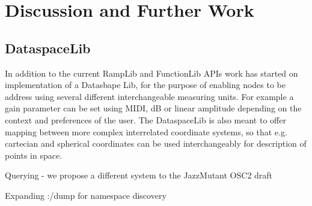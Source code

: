 \documentclass{NIME-alternate}
\begin{document}

\section{Discussion and Further Work} %
\label{sec:discussion_and_further_work}   

%

%
%
%



\subsection{DataspaceLib} %
\label{sub:dataspacelib}

In addition  to the current RampLib and FunctionLib APIs work has started on implementation of a Datasbape Lib, for the purpose of enabling nodes to be address using several different interchangeable measuring units. For example a gain parameter can be set using MIDI, dB or linear amplitude depending on the context and preferences of the user. The DataspaceLib is also meant to offer mapping between more complex interrelated coordinate systems, so that e.g. cartecian and spherical coordinates can be used interchangeably for description of points in space.






Querying - we propose a different system to the JazzMutant OSC2 draft

Expanding :/dump for namespace discovery
\end{document}

